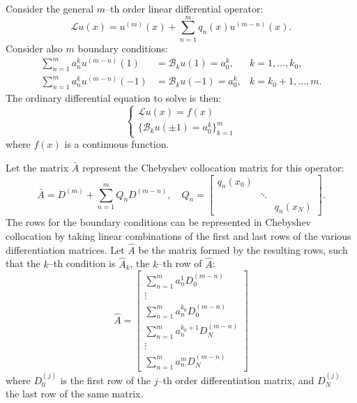\documentclass{article}
\begin{document}
Consider the general $m$--th order linear differential operator:
\begin{equation} \label{general operator}
\mathcal{L} u(x) = u^{(m)}(x) + \sum_{n = 1}^m q_n(x) u^{(m-n)}(x) .
\end{equation}
Consider also $m$ boundary conditions:
\begin{equation}
\begin{aligned}
\sum_{n = 1}^m a_n^k u^{(m-n)}(1) & = \mathcal{B}_k u(1) = a_0^k, & k = 1,...,k_0 , \\
\sum_{n = 1}^m a_n^k u^{(m-n)}(-1) & = \mathcal{B}_k u(-1) = a_0^k, & k = k_0+1,...,m .
\end{aligned}
\end{equation}
The ordinary differential equation to solve is then:
\begin{equation}
\begin{cases} \mathcal{L} u(x) = f(x) \\ \{ \mathcal{B}_k u(\pm 1) = a_0^k \}_{k=1}^m \end{cases}
\end{equation}
where $f(x)$ is a continuous function.

Let the matrix $\bar{A}$ represent the Chebyshev collocation matrix for this operator:
\begin{equation} \label{eq:Abar}
\bar{A} = D^{(m)} + \sum_{n=1}^m Q_n D^{(m-n)}, \quad Q_n = \begin{bmatrix} q_n(x_0) & & \\ & \ddots & \\ & & q_n(x_N) \end{bmatrix} .
\end{equation}
The rows for the boundary conditions can be represented in Chebyshev collocation by taking linear combinations of the first and last rows of the various differentiation matrices.
Let $\hat{A}$ be the matrix formed by the resulting rows, such that the $k$--th condition is $\hat{A}_k$, the $k$--th row of $\hat{A}$:
\begin{equation} \label{eq:Ahat}
\hat{A} = \begin{bmatrix} \sum_{n = 1}^m a_n^1 D^{(m-n)}_0 \\ \vdots \\ 
\sum_{n = 1}^m a_n^{k_0} D^{(m-n)}_0 \\[10pt]
\sum_{n = 1}^m a_n^{k_0+1} D^{(m-n)}_N \\ \vdots \\
\sum_{n = 1}^m a_n^m D^{(m-n)}_N \end{bmatrix}
\end{equation}
where $D^{(j)}_0$ is the first row of the $j$--th order differentiation matrix, and $D^{(j)}_N$ the last row of the same matrix.
\end{document}
